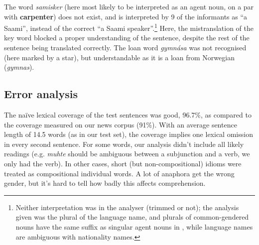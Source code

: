\documentclass{book}
\begin{document}

The word \textit{samisker} (here most likely to be interpreted as an
agent noun, on a par with \textbf{carpenter}) does not exist, and is
interpreted by 9 of the informants as ``a Saami'', instead of the
correct ``a Saami speaker''.\footnote{Neither interpretation was in
  the analyser (trimmed or not); the analysis given was the plural of
  the language name, and plurals of common-gendered nouns have the
  same suffix as singular agent nouns in \nob{}, while language names
  are ambiguous with nationality names.} Here, the mistranslation of
the key word blocked a proper understanding of the sentence, despite
the rest of the sentence being translated correctly. The loan word
\textit{gymn\'{a}sa} was not recognised (here marked by a star), but
understandable as it is a loan from Norwegian (\textit{gymnas}).



\subsection{Error analysis}



The na\"{i}ve lexical coverage of the test sentences was good, 96.7\%,
as compared to the coverage measured on our news corpus (91\%). With
an average sentence length of 14.5 words (as in our test set), the
coverage implies one lexical omission in every second sentence. For
some words, our analysis didn't include all likely readings (e.g.
\textit{muhte} should be ambiguous between a subjunction and a verb,
we only had the verb). In other cases, short (but non-compositional)
idioms were treated as compositional individual words. A lot of
anaphora get the wrong gender, but it's hard to tell how badly this
affects comprehension.
\end{document}
